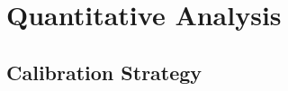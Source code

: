 \documentclass[onehalfspacing,11pt]{article}
\begin{document}
	
	
	\newpage
	\section{Quantitative Analysis}\label{sec:quant}
	\subsection{Calibration Strategy}\label{sec:calstrat}
	
\end{document}

